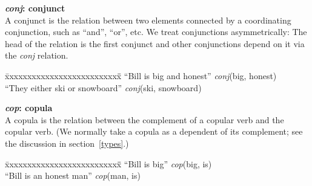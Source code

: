 \documentclass[11pt,letterpaper]{article}
\begin{document}


\noindent\textbf{\emph{conj}: conjunct}\\
A conjunct is the relation between two elements connected by a coordinating conjunction, such as ``and'', ``or'', etc.  We treat conjunctions asymmetrically: The head of the relation is the first conjunct and other conjunctions depend on it via the \emph{conj} relation.
\begin{tabbing}
\hspace{1cm} \= xxxxxxxxxxxxxxxxxxxxxxxxxx\= \hspace{.5cm}\=  \kill
\>  ``Bill is big and honest'' \> \> \emph{conj}(big, honest)\\
\hspace{1cm} \> ``They either ski or snowboard'' \> \>  \emph{conj}(ski, snowboard)\\
\end{tabbing}

\noindent\textbf{\emph{cop}: copula}\\
A copula is the relation between the complement of a copular verb and the copular verb.  (We normally take a copula as a dependent of its complement; see the discussion in section~\ref{types}.)
\begin{tabbing}
\hspace{1cm} \= xxxxxxxxxxxxxxxxxxxxxxxxxx\= \hspace{.5cm}\=  \kill
\> ``Bill is big'' \hspace{1cm} \> \> \emph{cop}(big, is)\\
\hspace{1cm} \> ``Bill is an honest man'' \>  \> \emph{cop}(man, is)\\
\end{tabbing}
\end{document}
